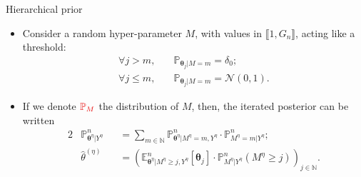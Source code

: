 \documentclass[10pt]{beamer}
\begin{document}
\begin{frame}{Hierarchical prior}
\begin{itemize}
\item Consider a \textcolor{red!90!black}{random hyper-parameter} \textcolor{red!90!black}{$M$}, with values in $\llbracket 1, G_{n} \rrbracket$, acting like a threshold:
\begin{align*}
\forall j > m ,& \quad \mathbb{P}_{\boldsymbol{\theta}_{j}\vert M = m} = \delta_{0};\\
\forall j \leq m ,& \quad \mathbb{P}_{\boldsymbol{\theta}_{j}\vert M = m} = \mathcal{N}\left(0, 1\right).
\end{align*}
\item If we denote $\textcolor{red!90!black}{\mathbb{P}_{M}}$ the distribution of $M$, then, the iterated posterior can be written
\textcolor{red!90!black}{
\begin{alignat*}{2}
&\mathbb{P}_{\boldsymbol{\theta}^{\eta}\vert Y^{\eta}}^{n} &&= \sum\limits_{m \in \mathbb{N}} \mathbb{P}_{\boldsymbol{\theta}^{\eta} \vert M^{\eta} = m, Y^{\eta}}^{n} \cdot \mathbb{P}^{n}_{M^{\eta} = m \vert Y^{\eta}};\\
&\widehat{\theta}^{\left(\eta\right)} &&= \left(\mathbb{E}_{\boldsymbol{\theta}^{\eta}\vert M^{\eta} \geq j, Y^{\eta}}^{n}\left[\boldsymbol{\theta}_{j}\right] \cdot \mathbb{P}_{M^{\eta} \vert Y^{\eta}}^{n}\left(M^{\eta} \geq j\right)\right)_{j \in \mathbb{N}}.
\end{alignat*}}
\end{itemize}
\end{frame}
\end{document}
